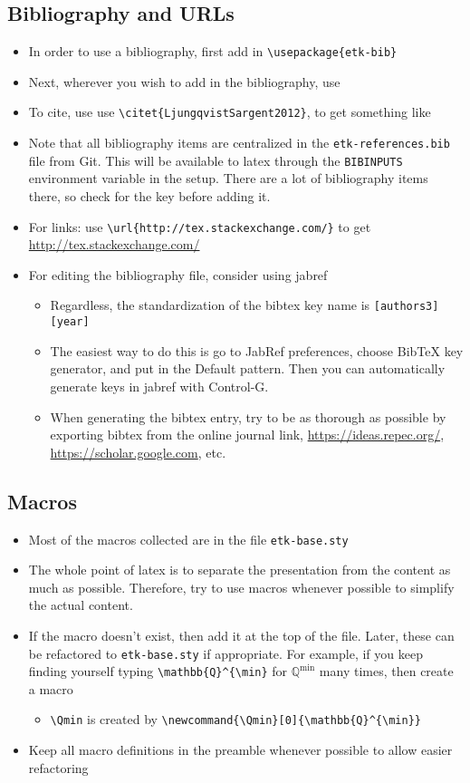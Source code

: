 \documentclass[12pt,etk-draft]{etk-article}
\begin{document}
\subsection{Bibliography and URLs}
\begin{itemize}
\item In order to use a bibliography, first add in \verb!\usepackage{etk-bib}!
\item Next, wherever you wish to add in the bibliography, use \verb!!
\item To cite, use use \verb!\citet{LjungqvistSargent2012}!, to get something like  \cite{LjungqvistSargent2012}
\item Note that all bibliography items are centralized in the \verb!etk-references.bib! file from Git.  This will be available to latex through the \verb!BIBINPUTS! environment variable in the setup.  There are a lot of bibliography items there, so check for the key before adding it.
\item For links: use \verb!\url{http://tex.stackexchange.com/}! to get \url{http://tex.stackexchange.com/}
\item For editing the bibliography file, consider using jabref
\begin{itemize}
\item Regardless, the standardization of the bibtex key name is \verb![authors3][year]!
\item The easiest way to do this is go to JabRef preferences, choose BibTeX key generator, and put in the Default pattern.  Then you can automatically generate keys in jabref with Control-G.
\item When generating the bibtex entry, try to be as thorough as possible by exporting bibtex from the online journal link, \url{https://ideas.repec.org/}, \url{https://scholar.google.com}, etc.
\end{itemize}
\end{itemize}
\subsection{Macros}\label{sec:macros}
\begin{itemize}
\item Most of the macros collected are in the file \verb!etk-base.sty!
\item The whole point of latex is to separate the presentation from the content as much as possible.  Therefore, try to use macros whenever possible to simplify the actual content.
\item If the macro doesn't exist, then add it at the top of the file.  Later, these can be refactored to \verb!etk-base.sty! if appropriate.  For example, if you keep finding yourself typing \verb!\mathbb{Q}^{\min}! for $\mathbb{Q}^{\min}$ many times, then create a macro
\begin{itemize}
\item  \verb!\Qmin! is created by \verb!\newcommand{\Qmin}[0]{\mathbb{Q}^{\min}}!
\end{itemize}
\item Keep all macro definitions in the preamble whenever possible to allow easier refactoring
\end{itemize}
\end{document}
